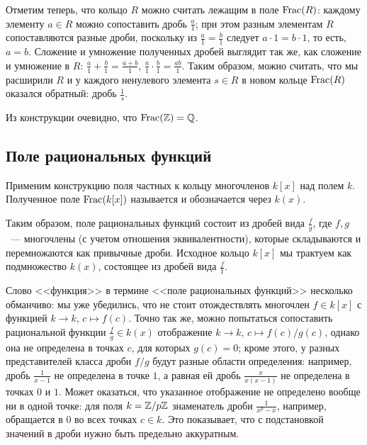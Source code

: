 Отметим теперь, что кольцо $R$ можно считать лежащим в поле
$\operatorname{Frac}(R)$: каждому элементу $a\in R$ можно сопоставить дробь
$\frac{a}{1}$; при этом разным элементам $R$ сопоставляются разные
дроби, поскольку из $\frac{a}{1}=\frac{b}{1}$ следует $a\cdot 1=b\cdot
1$, то есть, $a=b$. Сложение и умножение полученных дробей выглядит
так же, как сложение и умножение в $R$:
$\frac{a}{1}+\frac{b}{1}=\frac{a+b}{1}$,
$\frac{a}{1}\cdot\frac{b}{1}=\frac{ab}{1}$.
Таким образом, можно считать, что мы расширили $R$ и у каждого
ненулевого элемента $s\in R$ в новом кольце $\operatorname{Frac}(R)$ оказался
обратный: дробь $\frac{1}{s}$.

\begin{example}
Из конструкции очевидно, что $\operatorname{Frac}(\mathbb Z)=\mathbb Q$.
\end{example}

\subsection{Поле рациональных функций}


\begin{definition}
Применим конструкцию поля частных к кольцу многочленов $k[x]$ над
полем $k$. Полученное поле $\operatorname{Frac}(k[x])$ называется
 и обозначается через $k(x)$.
\end{definition}

Таким образом, поле рациональных функций состоит из дробей вида $\frac{f}{g}$,
где $f,g$~--- многочлены (с учетом отношения эквивалентности), которые
складываются и перемножаются как привычные дроби. Исходное кольцо
$k[x]$ мы трактуем как подмножество $k(x)$, состоящее из дробей вида
$\frac{f}{1}$.

\begin{remark}
Слово <<функция>> в термине <<поле рациональных функций>> несколько
обманчиво: мы уже убедились, что не стоит отождествлять многочлен
$f\in k[x]$ с функцией $k\to k$, $c\mapsto f(c)$. Точно так же, можно
попытаться сопоставить рациональной функции $\frac{f}{g}\in k(x)$
отображение $k\to k$, $c\mapsto f(c)/g(c)$, однако она не определена
в точках $c$, для которых $g(c)=0$; кроме этого, у разных
представителей класса дроби $f/g$ будут разные области определения:
например, дробь $\frac{1}{x-1}$ не определена в точке $1$, а равная ей
дробь $\frac{x}{x(x-1)}$ не определена в точках $0$ и $1$. Может
оказаться, что указанное отображение не определено вообще ни в одной
точке: для поля $k=\mathbb Z/p\mathbb Z$ знаменатель дроби $\frac{1}{x^p-x}$,
например, обращается в $0$ во всех точках $c\in k$. Это показывает,
что с подстановкой значений в дроби нужно быть предельно
аккуратным.
\end{remark}

